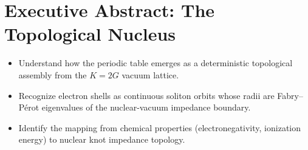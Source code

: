 \chapter{Executive Abstract: The Topological Nucleus}
\label{ch:intro}


\begin{objectivebox}
\begin{itemize}
    \item Understand how the periodic table emerges as a deterministic topological assembly from the $K=2G$ vacuum lattice.
    \item Recognize electron shells as continuous soliton orbits whose radii are Fabry--P\'{e}rot eigenvalues of the nuclear-vacuum impedance boundary.
    \item Identify the mapping from chemical properties (electronegativity, ionization energy) to nuclear knot impedance topology.
\end{itemize}
\end{objectivebox}

